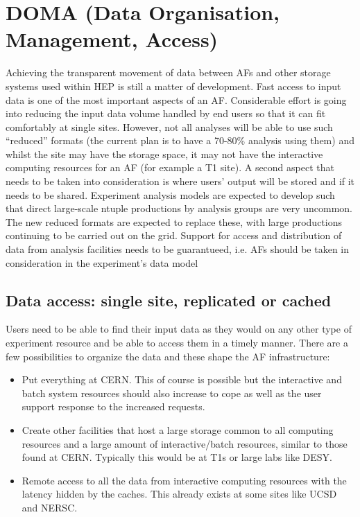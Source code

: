 \section{DOMA (Data Organisation, Management, Access) }
\label{doma}

Achieving the transparent movement of data between AFs and other storage systems used within HEP is still a matter of development. Fast access to input data is one of the most important aspects of an AF. Considerable effort is going into reducing the input data volume handled by end users so that it can fit comfortably at single sites. However, not all analyses will be able to use such “reduced” formats (the current plan is to have a 70-80\% analysis using them) and whilst the site may have the storage space, it may not have the interactive computing resources for an AF (for example a T1 site). A second aspect that needs to be taken into consideration is where users’ output will be stored and if it needs to be shared. Experiment analysis models are expected to develop such that direct large-scale ntuple productions by analysis groups are very uncommon. The new reduced formats are expected to replace these,  with large productions continuing to be carried out on the grid. Support for access and distribution of data from analysis facilities needs to be guarantueed, i.e. AFs should be taken in consideration in the experiment's data model

\subsection*{Data access: single site, replicated or cached}

Users need to be able to find their input data as they would on any other type of experiment resource and be able to access them in a timely manner. There are a few possibilities to organize the data and these shape the AF infrastructure:

\begin{itemize}
    \item Put everything at CERN. This of course is possible but the interactive and batch system resources should also increase to cope as well as the user support response to the increased requests.
    \item Create other facilities that host  a large storage common to all computing resources and a large amount of interactive/batch resources, similar to those found at CERN. Typically this would be at T1s or large labs like DESY. 
    \item Remote access to all the data from interactive computing resources with the latency hidden by the caches. This already exists at some sites like UCSD and NERSC.
\end{itemize}



